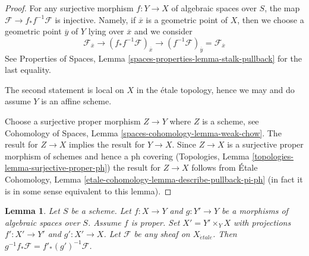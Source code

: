 \documentclass{stacks-project}
\theoremstyle{plain}
\newtheorem{lemma}[subsection]{Lemma}
\theoremstyle{definition}
\theoremstyle{remark}
\numberwithin{equation}{subsection}
\def\etale{{\acute{e}tale}}
\begin{document}
\begin{proof}
For any surjective morphism $f : Y \to X$ of algebraic spaces over $S$,
the map $\mathcal{F} \to f_*f^{-1}\mathcal{F}$ is injective.
Namely, if $\overline{x}$ is a geometric point of $X$, then we
choose a geometric point $\overline{y}$ of $Y$ lying over $\overline{x}$
and we consider
$$
\mathcal{F}_{\overline{x}} \to
(f_*f^{-1}\mathcal{F})_{\overline{x}} \to
(f^{-1}\mathcal{F})_{\overline{y}} = \mathcal{F}_{\overline{x}}
$$
See Properties of Spaces, Lemma \ref{spaces-properties-lemma-stalk-pullback}
for the last equality.

\medskip\noindent
The second statement is local on $X$ in the \'etale topology, hence we may
and do assume $Y$ is an affine scheme.

\medskip\noindent
Choose a surjective proper morphism $Z \to Y$ where $Z$ is a scheme, see
Cohomology of Spaces, Lemma \ref{spaces-cohomology-lemma-weak-chow}.
The result for $Z \to X$ implies the result for $Y \to X$.
Since $Z \to X$ is a surjective proper morphism of schemes
and hence a ph covering
(Topologies, Lemma \ref{topologies-lemma-surjective-proper-ph})
the result for $Z \to X$ follows from
\'Etale Cohomology, Lemma \ref{etale-cohomology-lemma-describe-pullback-pi-ph}
(in fact it is in some sense equivalent to this lemma).
\end{proof}

\begin{lemma}
\label{lemma-proper-base-change-f-star}
Let $S$ be a scheme. Let $f : X \to Y$ and $g : Y' \to Y$
be a morphisms of algebraic spaces over $S$. Assume $f$ is proper.
Set $X' = Y' \times_Y X$ with projections $f' : X' \to Y'$ and $g' : X' \to X$.
Let $\mathcal{F}$ be any sheaf on $X_\etale$. Then
$g^{-1}f_*\mathcal{F} = f'_*(g')^{-1}\mathcal{F}$.
\end{lemma}
\end{document}
